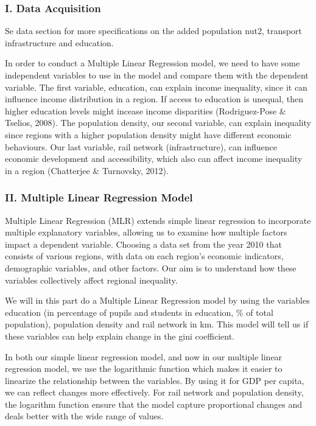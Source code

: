 \documentclass[
  a4paper,
  DIV=11,
  numbers=noendperiod]{scrartcl}
\begin{document}
\hypertarget{i.-data-acquisition}{%
\subsubsection{I. Data Acquisition}\label{i.-data-acquisition}}

Se data section for more specifications on the added population nut2,
transport infrastructure and education.

In order to conduct a Multiple Linear Regression model, we need to have
some independent variables to use in the model and compare them with the
dependent variable. The first variable, education, can explain income
inequality, since it can influence income distribution in a region. If
access to education is unequal, then higher education levels might
incease income disparities (Rodriguez-Pose \& Tselios, 2008). The
population density, our second variable, can explain inequality since
regions with a higher population density might have different economic
behaviours. Our last variable, rail network (infrastructure), can
influence economic development and accessibility, which also can affect
income inequality in a region (Chatterjee \& Turnovsky, 2012).

\hypertarget{ii.-multiple-linear-regression-model}{%
\subsubsection{II. Multiple Linear Regression
Model}\label{ii.-multiple-linear-regression-model}}

Multiple Linear Regression (MLR) extends simple linear regression to
incorporate multiple explanatory variables, allowing us to examine how
multiple factors impact a dependent variable. Choosing a data set from
the year 2010 that consists of various regions, with data on each
region's economic indicators, demographic variables, and other factors.
Our aim is to understand how these variables collectively affect
regional inequality.

We will in this part do a Multiple Linear Regression model by using the
variables education (in percentage of pupils and students in education,
\% of total population), population density and rail network in km. This
model will tell us if these variables can help explain change in the
gini coefficient.

In both our simple linear regression model, and now in our multiple
linear regression model, we use the logarithmic function which makes it
easier to linearize the relationship between the variables. By using it
for GDP per capita, we can reflect changes more effectively. For rail
network and population density, the logarithm function ensure that the
model capture proportional changes and deals better with the wide range
of values.
\end{document}
